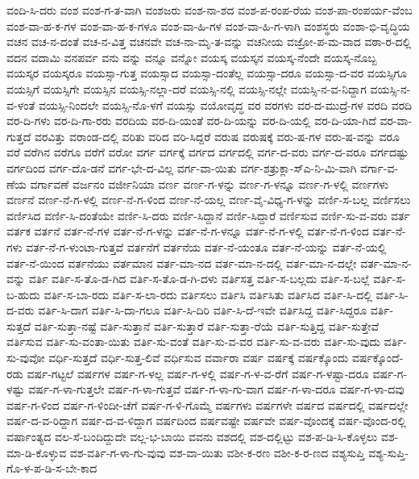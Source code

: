 {ವಂದಿ-ಸಿ-ದರು
ವಂಶ
ವಂಶ-ಗ-ತ-ವಾಗಿ
ವಂಶಜರು
ವಂಶ-ನಾ-ಶದ
ವಂಶ-ಪ-ರಂಪ-ರೆಯ
ವಂಶ-ಪಾ-ರಂಪರ್ಯ-ವೆಂಬ
ವಂಶ-ವಾ-ಹ-ಕ-ಗಳ
ವಂಶ-ವಾ-ಹ-ಕ-ಗಳೂ
ವಂಶ-ವಾ-ಹಿ-ಗಳ
ವಂಶ-ವಾ-ಹಿ-ಗ-ಳಾಗಿ
ವಂಶಸ್ಥರು
ವಂಶಾ-ಭಿ-ವೃದ್ಧಿಯ
ವಚನ
ವಚ-ನ-ದಂತೆ
ವಚ-ನ-ವಿತ್ತ
ವಚನವೇ
ವಚ-ನಾ-ಮೃ-ತ-ವನ್ನು
ವಚನೀಯ
ವಜ್ರೋ-ಪ-ಮ-ವಾದ
ವಠಾ-ರ-ದಲ್ಲಿ
ವದನ
ವದಾಮಿ
ವನಪರ್ವ
ವನು
ವನ್ನು
ವನ್ನೂ
ವನ್ನೋ
ವಯಸ್ಕ
ವಯಸ್ಕನ
ವಯಸ್ಕ-ನೆಂದೇ
ವಯಸ್ಕ-ನೊಬ್ಬ
ವಯಸ್ಕರ
ವಯಸ್ಕರೂ
ವಯಸ್ಸಾ-ಗುತ್ತ
ವಯಸ್ಸಾದ
ವಯಸ್ಸಾ-ದಂತೆಲ್ಲ
ವಯಸ್ಸಾ-ದರೂ
ವಯಸ್ಸಾ-ದ-ವರ
ವಯಸ್ಸಿಗೂ
ವಯಸ್ಸಿಗೆ
ವಯಸ್ಸಿಗೇ
ವಯಸ್ಸಿನ
ವಯಸ್ಸಿ-ನಲ್ಲಾ-ದರೆ
ವಯಸ್ಸಿ-ನಲ್ಲಿ
ವಯಸ್ಸಿ-ನಲ್ಲೇ
ವಯಸ್ಸಿ-ನ-ವ-ನಿದ್ದಾಗ
ವಯಸ್ಸಿ-ನ-ವ-ಳಂತೆ
ವಯಸ್ಸಿ-ನಿಂದಲೇ
ವಯಸ್ಸಿ-ನೊ-ಳಗೆ
ವಯಸ್ಸು
ವಯೋವೃದ್ಧ
ವರ
ವರಗಳು
ವರ-ದ-ಮುದ್ರೆ-ಗಳ
ವರದಿ
ವರದಿ
ವರ-ದಿ-ಗಳು
ವರ-ದಿ-ಗಾ-ರರು
ವರದಿಯ
ವರ-ದಿ-ಯಂತೆ
ವರ-ದಿ-ಯನ್ನು
ವರ-ದಿ-ಯಲ್ಲಿ
ವರ-ದಿ-ಯಾ-ಗಿದೆ
ವರ-ವಾ-ಗುತ್ತದೆ
ವರವಿತ್ತು
ವರಾಂಡ-ದಲ್ಲಿ
ವರಿತು
ವರಿದ
ವರಿ-ಸಿದ್ದರೆ
ವರುಷ
ವರುಷಕ್ಕೆ
ವರು-ಷ-ಗಳ
ವರು-ಷ-ವನ್ನು
ವರೂ
ವರೆ
ವರೆಗಿನ
ವರೆಗೂ
ವರೆಗೆ
ವರೋ
ವರ್ಗ
ವರ್ಗಕ್ಕೆ
ವರ್ಗದ
ವರ್ಗದಲ್ಲಿ
ವರ್ಗ-ದ-ವರು
ವರ್ಗ-ದ-ವರೂ
ವರ್ಗದಷ್ಟು
ವರ್ಗದಿಂದ
ವರ್ಗ-ದೊ-ಡನೆ
ವರ್ಗ-ಭೇ-ದ-ವಿಲ್ಲ
ವರ್ಗ-ವಾ-ಯಿತು
ವರ್ಗ-ಶತ್ರುಕ್ಲಾ-ಸ್ಎ-ನಿ-ಮಿ-ವಾಗಿ
ವರ್ಗಾ-ವ-ಣೆಯ
ವರ್ಗಾವಣೆ
ವರ್ಜನಂ
ವರ್ಜೀನಿಯಾ
ವರ್ಣ
ವರ್ಣ-ಗ-ಳನ್ನು
ವರ್ಣ-ಗ-ಳನ್ನೂ
ವರ್ಣ-ಗ-ಳಲ್ಲಿ
ವರ್ಣಗಳು
ವರ್ಣನೆ
ವರ್ಣ-ನೆ-ಗ-ಳಲ್ಲಿ
ವರ್ಣ-ನೆ-ಗ-ಳಿಂದ
ವರ್ಣ-ನೆ-ಯಲ್ಲ
ವರ್ಣ-ವೈ-ವಿಧ್ಯ-ಗ-ಳನ್ನು
ವರ್ಣಿ-ಸ-ಬಲ್ಲ
ವರ್ಣಿಸಲು
ವರ್ಣಿಸಿದ
ವರ್ಣಿ-ಸಿ-ದಂತೆಯೇ
ವರ್ಣಿ-ಸಿ-ದರು
ವರ್ಣಿ-ಸಿದ್ದಾನೆ
ವರ್ಣಿ-ಸಿದ್ದಾರೆ
ವರ್ಣಿಸುವ
ವರ್ಣಿ-ಸು-ವ-ವರು
ವರ್ತ
ವರ್ತಕ
ವರ್ತನೆ
ವರ್ತ-ನೆ-ಗಳ
ವರ್ತ-ನೆ-ಗ-ಳನ್ನು
ವರ್ತ-ನೆ-ಗ-ಳನ್ನೂ
ವರ್ತ-ನೆ-ಗ-ಳಲ್ಲಿ
ವರ್ತ-ನೆ-ಗ-ಳಿಂದ
ವರ್ತ-ನೆ-ಗಳು
ವರ್ತ-ನೆ-ಗ-ಳುಂಟಾ-ಗುತ್ತವೆ
ವರ್ತನೆಗೆ
ವರ್ತನೆಯ
ವರ್ತ-ನೆ-ಯಂತೂ
ವರ್ತ-ನೆ-ಯನ್ನು
ವರ್ತ-ನೆ-ಯಲ್ಲಿ
ವರ್ತ-ನೆ-ಯಿಂದ
ವರ್ತನೆಯು
ವರ್ತಮಾನ
ವರ್ತ-ಮಾ-ನದ
ವರ್ತ-ಮಾ-ನ-ದಲ್ಲಿ
ವರ್ತ-ಮಾ-ನ-ದಲ್ಲೇ
ವರ್ತ-ಮಾ-ನ-ವನ್ನು
ವರ್ತಿ
ವರ್ತಿ-ಸ-ತೊ-ಡ-ಗಿದ
ವರ್ತಿ-ಸ-ತೊ-ಡ-ಗಿ-ದಳು
ವರ್ತಿಸತ್ತ
ವರ್ತಿ-ಸ-ಬಲ್ಲದು
ವರ್ತಿ-ಸ-ಬಲ್ಲೆ
ವರ್ತಿ-ಸ-ಬ-ಹುದು
ವರ್ತಿ-ಸ-ಬಾ-ರದು
ವರ್ತಿ-ಸ-ಲಾ-ರದು
ವರ್ತಿಸಲು
ವರ್ತಿಸಿ
ವರ್ತಿಸಿತು
ವರ್ತಿಸಿದ
ವರ್ತಿ-ಸಿ-ದಲ್ಲಿ
ವರ್ತಿ-ಸಿ-ದ-ವರು
ವರ್ತಿ-ಸಿ-ದಾಗ
ವರ್ತಿ-ಸಿ-ದಾ-ಗಲೂ
ವರ್ತಿ-ಸಿ-ದಿರಿ
ವರ್ತಿ-ಸಿ-ದೆ-ಇವೇ
ವರ್ತಿಸಿದ್ದ
ವರ್ತಿ-ಸಿದ್ದರೂ
ವರ್ತಿ-ಸುತ್ತದೆ
ವರ್ತಿ-ಸುತ್ತಾ-ನಷ್ಟೆ
ವರ್ತಿ-ಸುತ್ತಾನೆ
ವರ್ತಿ-ಸುತ್ತಾರೆ
ವರ್ತಿ-ಸುತ್ತಾ-ರೆಯೆ
ವರ್ತಿ-ಸುತ್ತಿದ್ದ
ವರ್ತಿ-ಸುತ್ತೇವೆ
ವರ್ತಿಸುವ
ವರ್ತಿ-ಸು-ವಂತಾ-ಯಿತು
ವರ್ತಿ-ಸು-ವಂತೆ
ವರ್ತಿ-ಸು-ವ-ವರ
ವರ್ತಿ-ಸು-ವ-ವರು
ವರ್ತಿ-ಸು-ವುದು
ವರ್ತಿ-ಸು-ವುವೋ
ವರ್ಧಿ-ಸುತ್ತದೆ
ವರ್ಧಿ-ಸುತ್ತ-ಲಿವೆ
ವರ್ಧಿಸುವ
ವರ್ವಾರಾ
ವರ್ಷ
ವರ್ಷಕ್ಕೆ
ವರ್ಷಕ್ಕೊಂದು
ವರ್ಷಕ್ಕೊಂದೆ-ರಡು
ವರ್ಷ-ಗಟ್ಟಲೆ
ವರ್ಷಗಳ
ವರ್ಷ-ಗ-ಳಲ್ಲ
ವರ್ಷ-ಗ-ಳಲ್ಲಿ
ವರ್ಷ-ಗ-ಳ-ವ-ರೆಗೆ
ವರ್ಷ-ಗ-ಳಷ್ಟಾ-ದರೂ
ವರ್ಷ-ಗ-ಳಷ್ಟು
ವರ್ಷ-ಗ-ಳಾ-ಗುತ್ತಲೇ
ವರ್ಷ-ಗ-ಳಾ-ಗುತ್ತವೆ
ವರ್ಷ-ಗ-ಳಾ-ಗು-ವಾಗ
ವರ್ಷ-ಗ-ಳಾ-ದರೂ
ವರ್ಷ-ಗ-ಳಾ-ದವು
ವರ್ಷ-ಗ-ಳಿಂದ
ವರ್ಷ-ಗ-ಳಿಂದೀ-ಚೆಗೆ
ವರ್ಷ-ಗ-ಳಿ-ಗೊಮ್ಮೆ
ವರ್ಷಗಳು
ವರ್ಷಗಳೇ
ವರ್ಷದ
ವರ್ಷದಲ್ಲಿ
ವರ್ಷದಲ್ಲೇ
ವರ್ಷ-ದ-ವ-ರಿದ್ದಾಗ
ವರ್ಷ-ದ-ವ-ಳಿದ್ದಾಗ
ವರ್ಷದಿಂದ
ವರ್ಷವಷ್ಟೇ
ವರ್ಷವೇ
ವರ್ಷ-ವೊಂದಕ್ಕೆ
ವರ್ಷ-ವೊಂದ-ರಲ್ಲಿ
ವರ್ಷಾಂತ್ಯದ
ವಲ-ಸೆ-ಬಂದಿದ್ದುದೇ
ವಲ್ಲ-ಭ-ಬಾಯಿ
ವವನು
ವಶದಲ್ಲಿ
ವಶ-ದಲ್ಲಿಟ್ಟು
ವಶ-ಪ-ಡಿ-ಸಿ-ಕೊಳ್ಳಲು
ವಶ-ಮಾ-ಡಿ-ಕೊಳ್ಳುವ
ವಶ-ವರ್ತಿ-ಗ-ಳಾ-ಗು-ವುವು
ವಶ-ವಾ-ಯಿತು
ವಶೀ-ಕ-ರಣ
ವಶೀ-ಕ-ರ-ಣದ
ವಶ್ಯಸುಪ್ತಿ
ವಶ್ಯ-ಸುಪ್ತಿ-ಗೊ-ಳ-ಪ-ಡಿ-ಸ-ಬೇ-ಕಾದ
}
